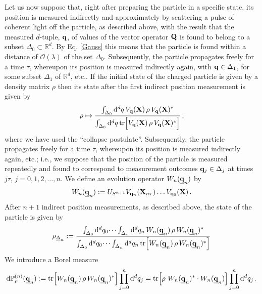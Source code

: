 \documentclass[12pt]{article}
\renewcommand{\d}{{\mathrm d}}
\begin{document}
Let us now suppose that, right after preparing the particle in a specific state, its position is measured indirectly and approximately by scattering a pulse of coherent light off the particle, as described above, with the result that the measured $d$-tuple, ${\bf{q}}$, of values of the vector operator ${\bf{Q}}$ is found to belong to a subset $\Delta_0 \subset \mathbb{R}^{d}$. By Eq. \eqref{Gauss} this means that the particle is found within a distance of $\mathcal{O}(\lambda)$ of the set $\Delta_0$. Subsequently, the particle propagates freely for a time $\tau$, whereupon its position is measured indirectly again, with ${\bf{q}} \in \Delta_1$, for some subset $\Delta_1$ of $\mathbb{R}^{d}$, etc.. If the initial state of the charged particle is given by a density matrix $\rho$ then its state after the first indirect position measurement is given by
\begin{equation}\label{collapse}
\rho \mapsto \frac{\int_{\Delta_0} \d^{d}{q}\, V_{{\bf{q}}}({\bf{X}}) \, \rho \, V_{{\bf{q}}}({\bf{X}})^{*}}{\int_{\Delta_0} 
\d^{d}{q}\, \text{tr}\Big[ V_{{\bf{q}}}({\bf{X}}) \, \rho \, V_{{\bf{q}}}({\bf{X}})^{*}\Big]} \,,
\end{equation}
where we have used the ``collapse postulate''.
Subsequently, the particle propagates freely for a time $\tau$, whereupon its position is measured indirectly again, etc.; i.e., 
we suppose that the position of the particle is measured repeatedly and found to correspond to measurement outcomes 
${\bf{q}}_j\in \Delta_j$ at times $j\tau$, $j=0, 1, 2, \dots, n$. We define an evolution operator $W_{n}(\underline{{\bf{q}}}_{n})$ by
\begin{equation}\label{history}
W_{n}(\underline{{\bf{q}}}_{n}):= U_{S^{n+1}}V_{{\bf{q}}_{n}}({\bf{X}}_{n\tau}) \dots V_{{\bf{q}}_{0}}({\bf{X}})\,.
\end{equation}
After $n+1$ indirect position measurements, as described above, the state of the particle is given by
\begin{equation}\label{measured state}
\rho_{\underline{\Delta}_n}:= \frac{\int_{\Delta_0} \d^{d}{q}_0 \dots \int_{\Delta_n} \d^{d}{q}_n \, W_{n}(\underline{{\bf{q}}}_{n})\, \rho\, W_{n}(\underline{{\bf{q}}}_{n})^{*}}{\int_{\Delta_0} \d^{d}{q}_0 \dots \int_{\Delta_n} 
\d^{d}{q}_n \, \text{tr}\Big[ 
W_{n}(\underline{{\bf{q}}}_{n})\, \rho\, W_{n}(\underline{{\bf{q}}}_{n})^{*} \Big]}
\end{equation}
 We introduce a Borel measure 
 \begin{equation}\label{prob measure}
 \d \mathbb{P}^{(n)}_{\rho}(\underline{{\bf{q}}}_{n}):= 
 \text{tr}\Big[ W_{n}(\underline{{\bf{q}}}_{n})\, \rho\, W_{n}(\underline{{\bf{q}}}_{n})^{*} \Big] \prod_{j=0}^{n} \d^{d}{q}_j = 
 \text{tr}\Big[  \rho\,\, W_{n}(\underline{{\bf{q}}}_{n})^{*} \cdot W_{n}(\underline{{\bf{q}}}_{n}) \Big] \prod_{j=0}^{n}
 \d^{d}{q}_j \,.
 \end{equation}
\end{document}
